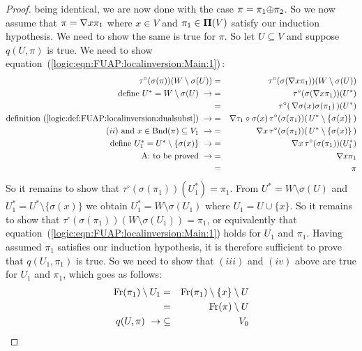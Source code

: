 \begin{proof}
being identical, we are now done with the case
$\pi=\pi_{1}\mbox{$\oplus$}\pi_{2}$. So we now assume that $\pi=\mbox{$\nabla$} x\pi_{1}$
where $x\in V$ and $\pi_{1}\in\mbox{${\bf\Pi}(V)$}$ satisfy our induction
hypothesis. We need to show the same is true for $\pi$. So let
$U\subseteq V$ and suppose $q(U,\pi)$ is true. We need to show
equation~(\ref{logic:eqn:FUAP:localinversion:Main:1})\,:
    \begin{eqnarray*}
    \tau^{\circ}(\sigma(\pi))(W\setminus\sigma(U))&=&
    \tau^{\circ}(\sigma(\mbox{$\nabla$} x\pi_{1}))(W\setminus\sigma(U))\\
    \mbox{define $U^{*}=W\setminus\sigma(U)$}\ \rightarrow
    &=&\tau^{\circ}(\sigma(\mbox{$\nabla$} x\pi_{1}))(U^{*})\\
    &=&\tau^{\circ}(\,\mbox{$\nabla$}\sigma(x)\sigma(\pi_{1})\,)(U^{*})\\
    \mbox{definition~(\ref{logic:def:FUAP:localinversion:dualsubst})}\
    \rightarrow
    &=&\mbox{$\nabla$} \tau_{1}\circ\sigma(x)\,\tau^{\circ}(
    \sigma(\pi_{1}))(\,U^{*}\setminus\{\sigma(x)\}\,)\\
    \mbox{$(ii)$ and $x\in\mbox{\rm Bnd}(\pi)\subseteq V_{1}$}\ \rightarrow
    &=&\mbox{$\nabla$} x\,\tau^{\circ}(
    \sigma(\pi_{1}))(\,U^{*}\setminus\{\sigma(x)\}\,)\\
    \mbox{define $U_{1}^{*}=U^{*}\setminus\{\sigma(x)\}$}\ \rightarrow
    &=&\mbox{$\nabla$} x\,\tau^{\circ}(\sigma(\pi_{1}))(U_{1}^{*})\\
    \mbox{A: to be proved}\ \rightarrow
    &=&\mbox{$\nabla$} x\pi_{1}\\
    &=&\pi
    \end{eqnarray*}
So it remains to show that
$\tau^{\circ}(\sigma(\pi_{1}))(U_{1}^{*})=\pi_{1}$. From
$U^{*}=W\setminus\sigma(U)$ and
$U_{1}^{*}=U^{*}\setminus\{\sigma(x)\}$ we obtain
$U_{1}^{*}=W\setminus\sigma(U_{1})$ where $U_{1}=U\cup\{x\}$. So it
remains to show that
$\tau^{\circ}(\sigma(\pi_{1}))(W\setminus\sigma(U_{1}))=\pi_{1}$, or
equivalently that
equation~(\ref{logic:eqn:FUAP:localinversion:Main:1}) holds for
$U_{1}$ and $\pi_{1}$. Having assumed $\pi_{1}$ satisfies our
induction hypothesis, it is therefore sufficient to prove that
$q(U_{1},\pi_{1})$ is true. So we need to show that $(iii)$ and
$(iv)$ above are true for $U_{1}$ and $\pi_{1}$, which goes as
follows:
    \begin{eqnarray*}
    \mbox{\rm Fr}(\pi_{1})\setminus
    U_{1}&=&\mbox{\rm Fr}(\pi_{1})\setminus\{x\}\setminus U\\
    &=&\mbox{\rm Fr}(\pi)\setminus U\\
    q(U,\pi)\ \rightarrow&\subseteq&V_{0}
    \end{eqnarray*}

\end{proof}
